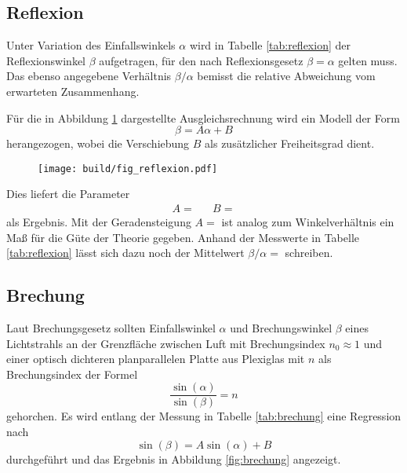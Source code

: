 \subsection{Reflexion}

Unter Variation des Einfallswinkels $\alpha$ wird in Tabelle \ref{tab:reflexion} der Reflexionswinkel $\beta$ aufgetragen, für den nach
Reflexionsgesetz $\beta = \alpha$ gelten muss. Das ebenso angegebene Verhältnis $\beta / \alpha$ bemisst die relative Abweichung vom
erwarteten Zusammenhang.

Für die in Abbildung \ref{fig:reflexion} dargestellte Ausgleichsrechnung wird ein Modell der Form
\begin{equation*}
	\beta = A \alpha + B
\end{equation*}
herangezogen, wobei die Verschiebung $B$ als zusätzlicher Freiheitsgrad dient.

\begin{figure}[H]
	\texttt{[image: build/fig\_reflexion.pdf]}
	\caption{}
	\label{fig:reflexion}
\end{figure}

Dies liefert die Parameter
\begin{align*}
	A =  && B = 
\end{align*}
als Ergebnis. Mit der Geradensteigung $A = $ ist analog zum Winkelverhältnis ein Maß für die Güte der Theorie gegeben.
Anhand der Messwerte in Tabelle \ref{tab:reflexion} lässt sich dazu noch der Mittelwert $\beta / \alpha = $ schreiben.

\begin{table}[H]
	\centering
	\caption{}
	
	\label{tab:reflexion}
\end{table}


\subsection{Brechung}

Laut Brechungsgesetz sollten Einfallswinkel $\alpha$ und Brechungswinkel $\beta$ eines Lichtstrahls an der Grenzfläche zwischen Luft mit
Brechungsindex $n_0 \approx 1$ und einer optisch dichteren planparallelen Platte aus Plexiglas mit $n$ als Brechungsindex der Formel
\begin{equation*}
	\frac{\sin(\alpha)}{\sin(\beta)} = n
\end{equation*}
gehorchen. Es wird entlang der Messung in Tabelle \ref{tab:brechung} eine Regression nach
\begin{equation*}
	\sin(\beta) = A \sin(\alpha) + B
\end{equation*}
durchgeführt und das Ergebnis in Abbildung \ref{fig:brechung} angezeigt.

